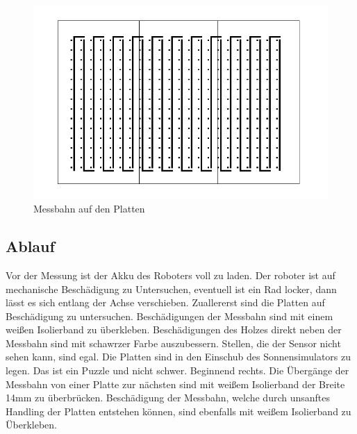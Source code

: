 \documentclass[a4paper,bibtotoc,oneside]{scrbook}
\begin{document}
\begin{figure}[htbp]
\centering
\includegraphics[width=125mm]{img/messbahn1.png}
\caption[Messbahn auf den Platten]{Messbahn auf den Platten}\label{bahn}
\end{figure}






\subsection{Ablauf}\thispagestyle{empty}
Vor der Messung ist der Akku des Roboters voll zu laden. Der roboter ist auf mechanische Beschädigung zu Untersuchen, eventuell ist ein Rad locker, dann lässt es sich entlang der Achse verschieben.
Zuallererst sind die Platten auf Beschädigung zu untersuchen. Beschädigungen der Messbahn sind mit einem weißen Isolierband zu überkleben. Beschädigungen des Holzes direkt neben der Messbahn sind mit schawrzer Farbe auszubessern. Stellen, die der Sensor nicht sehen kann, sind egal.
Die Platten sind in den Einschub des Sonnensimulators zu legen. Das ist ein Puzzle und nicht schwer. Beginnend rechts. Die Übergänge der Messbahn von einer Platte zur nächsten sind mit weißem Isolierband  der Breite 14mm zu überbrücken. Beschädigung der Messbahn, welche durch unsanftes Handling der Platten entstehen können, sind ebenfalls mit weißem Isolierband zu Überkleben.
\end{document}
